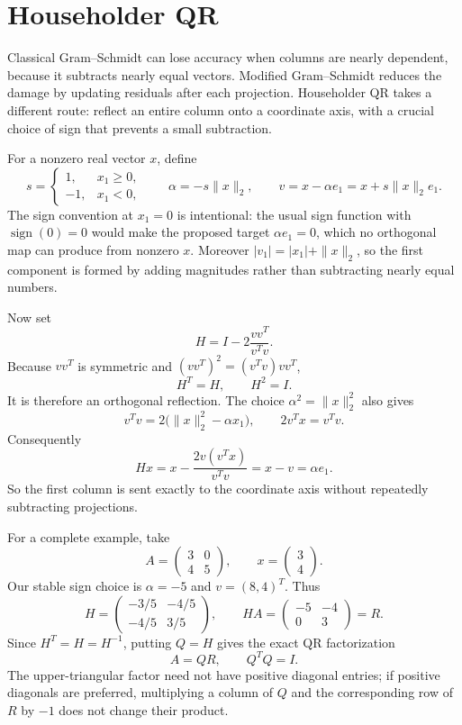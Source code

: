 \section{Householder QR}

Classical Gram--Schmidt can lose accuracy when columns are nearly dependent, because it subtracts nearly equal vectors. Modified Gram--Schmidt reduces the damage by updating residuals after each projection. Householder QR takes a different route: reflect an entire column onto a coordinate axis, with a crucial choice of sign that prevents a small subtraction.

For a nonzero real vector \(x\), define
\[
 s=\begin{cases}1,&x_1\ge0,\\-1,&x_1<0,\end{cases}
 \qquad
 \alpha=-s\|x\|_2,
 \qquad v=x-\alpha e_1=x+s\|x\|_2e_1.
\]
The sign convention at \(x_1=0\) is intentional: the usual sign function with \(\operatorname{sign}(0)=0\) would make the proposed target \(\alpha e_1=0\), which no orthogonal map can produce from nonzero \(x\). Moreover \(|v_1|=|x_1|+\|x\|_2\), so the first component is formed by adding magnitudes rather than subtracting nearly equal numbers.

Now set
\[
 \boxed{H=I-2\frac{vv^T}{v^Tv}.}
\]
Because \(vv^T\) is symmetric and \((vv^T)^2=(v^Tv)vv^T\),
\[
 H^T=H,\qquad H^2=I.
\]
It is therefore an orthogonal reflection. The choice \(\alpha^2=\|x\|_2^2\) also gives
\[
 v^Tv=2\bigl(\|x\|_2^2-\alpha x_1\bigr),
 \qquad
 2v^Tx=v^Tv.
\]
Consequently
\[
 Hx=x-\frac{2v(v^Tx)}{v^Tv}=x-v
     =\boxed{\alpha e_1}.
\]
So the first column is sent exactly to the coordinate axis without repeatedly subtracting projections.

For a complete example, take
\[
 A=\begin{pmatrix}3&0\\4&5\end{pmatrix},\qquad
 x=\begin{pmatrix}3\\4\end{pmatrix}.
\]
Our stable sign choice is \(\alpha=-5\) and \(v=(8,4)^T\). Thus
\[
 H=
 \begin{pmatrix}-3/5&-4/5\\-4/5&3/5\end{pmatrix},
 \qquad
 HA=
 \begin{pmatrix}-5&-4\\0&3\end{pmatrix}=R.
\]
Since \(H^T=H=H^{-1}\), putting \(Q=H\) gives the exact QR factorization
\[
 \boxed{A=QR,\qquad Q^TQ=I.}
\]
The upper-triangular factor need not have positive diagonal entries; if positive diagonals are preferred, multiplying a column of \(Q\) and the corresponding row of \(R\) by \(-1\) does not change their product.

